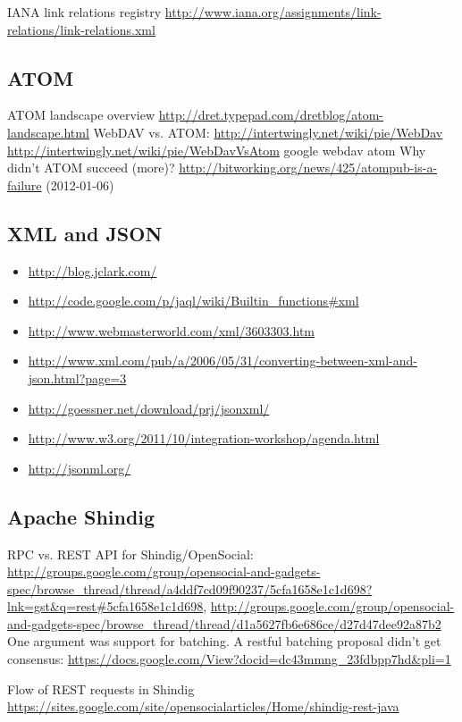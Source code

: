 \documentclass[12pt,a4paper]{scrartcl}		%
\newcommand{\citeurl}[2]{\url{#1} (#2)}
\begin{document}
IANA link relations registry \url{http://www.iana.org/assignments/link-relations/link-relations.xml}

\subsection{ATOM}
ATOM landscape overview \url{http://dret.typepad.com/dretblog/atom-landscape.html}
WebDAV vs. ATOM:
\url{http://intertwingly.net/wiki/pie/WebDav}
\url{http://intertwingly.net/wiki/pie/WebDavVsAtom}
google webdav atom
Why didn't ATOM succeed (more)? \citeurl{http://bitworking.org/news/425/atompub-is-a-failure}{2012-01-06}

\subsection{XML and JSON}

\begin{itemize}
\item \url{http://blog.jclark.com/}
\item \url{http://code.google.com/p/jaql/wiki/Builtin_functions#xml}
\item \url{http://www.webmasterworld.com/xml/3603303.htm}
\item \url{http://www.xml.com/pub/a/2006/05/31/converting-between-xml-and-json.html?page=3}
\item \url{http://goessner.net/download/prj/jsonxml/}
\item \url{http://www.w3.org/2011/10/integration-workshop/agenda.html}
\item \url{http://jsonml.org/}
\end{itemize}

\subsection{Apache Shindig}
RPC vs. REST API for Shindig/OpenSocial: \url{http://groups.google.com/group/opensocial-and-gadgets-spec/browse_thread/thread/a4ddf7cd09f90237/5cfa1658e1c1d698?lnk=gst&q=rest#5cfa1658e1c1d698}, \url{http://groups.google.com/group/opensocial-and-gadgets-spec/browse_thread/thread/d1a5627fb6e686ce/d27d47dee92a87b2} One argument was support for batching. A restful batching proposal didn't get consensus: \url{https://docs.google.com/View?docid=dc43mmng_23fdbpp7hd&pli=1}

Flow of REST requests in Shindig \url{https://sites.google.com/site/opensocialarticles/Home/shindig-rest-java}
\end{document}
